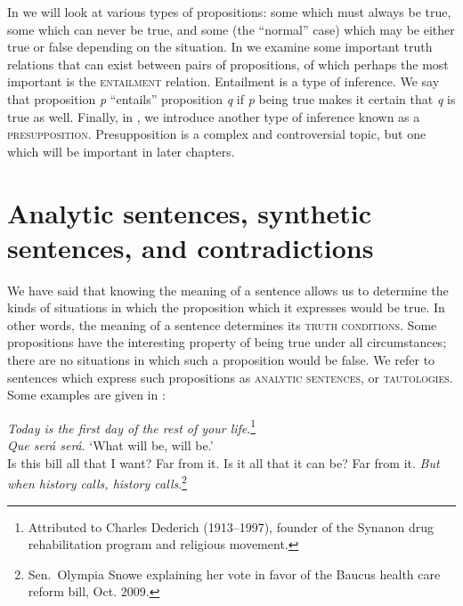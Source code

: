 In  we will look at various types of propositions: some which must always be true, some which can never be true, and some (the “normal” case) which may be either true or false depending on the situation. In  we examine some important truth relations that can exist between pairs of propositions, of which perhaps the most important is the \textsc{entailment} relation. Entailment is a type of inference. We say that proposition \textit{p} “entails” proposition \textit{q} if \textit{p} being true makes it certain that \textit{q} is true as well. Finally, in , we introduce another type of inference known as a \textsc{presupposition}. Presupposition is a complex and controversial topic, but one which will be important in later chapters.


\section{Analytic sentences, synthetic sentences, and contradictions}\label{sec:3.2}

We have said that knowing the meaning of a sentence allows us to determine the kinds of situations in which the proposition which it expresses would be true. In other words, the meaning of a sentence determines its \textsc{truth conditions}. Some propositions have the interesting property of being true under all circumstances; there are no situations in which such a proposition would be false. We refer to sentences which express such propositions as \textsc{analytic sentences}, or \textsc{tautologies}. Some examples are given in :


\ea \label{ex:3.3}
\ea \textit{Today is the first day of the rest of your life}.\footnote{Attributed to Charles Dederich (1913–1997), founder of the Synanon drug rehabilitation program and religious movement.}\\
\ex \textit{Que será será}. ‘What will be, will be.’\\
\ex Is this bill all that I want? Far from it. Is it all that it can be? Far from it. \textit{But when history calls, history calls}.\footnote{Sen.~Olympia Snowe explaining her vote in favor of the Baucus health care reform bill, Oct. 2009.}
                       \z
\z


